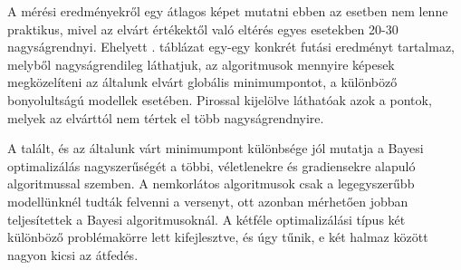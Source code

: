 A mérési eredményekről egy átlagos képet mutatni ebben az esetben nem lenne praktikus, mivel az elvárt értékektől való eltérés egyes esetekben 20-30 nagyságrendnyi. Ehelyett  . táblázat egy-egy konkrét futási eredményt tartalmaz, melyből nagyságrendileg láthatjuk, az algoritmusok mennyire képesek megközelíteni az általunk elvárt globális minimumpontot, a különböző bonyolultságú modellek esetében. Pirossal kijelölve láthatóak azok a pontok, melyek az elvárttól nem tértek el több nagyságrendnyire.

A talált, és az általunk várt minimumpont különbsége jól mutatja a Bayesi optimalizálás nagyszerűségét a többi, véletlenekre és gradiensekre alapuló algoritmussal szemben. A nemkorlátos algoritmusok csak a legegyszerűbb modellünknél tudták felvenni a versenyt, ott azonban mérhetően jobban teljesítettek a Bayesi algoritmusoknál. A kétféle optimalizálási típus két különböző problémakörre lett kifejlesztve, és úgy tűnik, e két halmaz között nagyon kicsi az átfedés.

